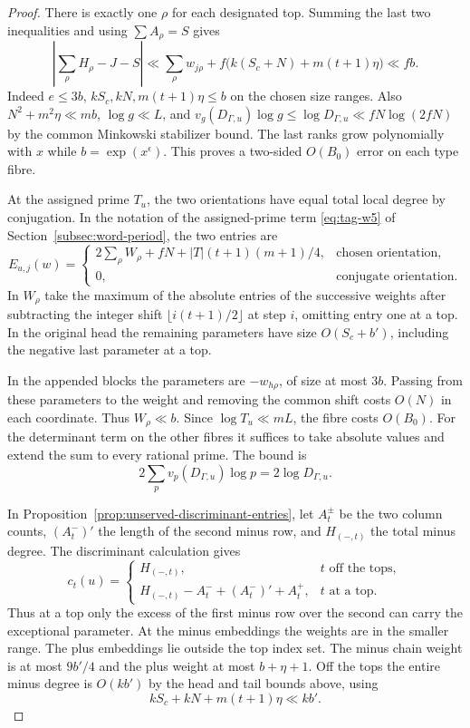 \begin{proof}
There is exactly one
\(\rho\) for each designated top. Summing the last two inequalities
and using \(\sum A_\rho=S\) gives
\[
 \left|\sum_\rho H_\rho-J-S\right|
 \ll \sum_\rho w_{j\rho}+f\big(k(S_c+N)+m(t+1)\eta\big)\ll fb .
\]
Indeed \(e\le 3b\), \(kS_c,kN,m(t+1)\eta\le b\) on the chosen
size ranges. Also \(N^2+m^2\eta\ll mb\), \(\log g\ll L\), and
\(v_g(D_{\Gamma,u})\log g\le\log D_{\Gamma,u}\ll
fN\log(2fN)\) by the common Minkowski stabilizer bound. The last
ranks grow polynomially with \(x\) while \(b=\exp(x^\epsilon)\).
This proves a two-sided \(O(B_0)\) error on each type fibre.

At the assigned prime \(T_u\), the two orientations have equal
total local degree by conjugation. In the notation of the assigned-prime
term \eqref{eq:tag-w5} of Section~\ref{subsec:word-period}, the two entries are
\[
 E_{u,j}(w)=
 \begin{cases}
 2\sum_\rho W_\rho+fN+|T|(t+1)(m+1)/4,&\text{chosen orientation},\\
 0,&\text{conjugate orientation}.
 \end{cases}
\] In \(W_\rho\) take the maximum of the
absolute entries of the successive weights after subtracting the
integer shift \(\lfloor i(t+1)/2\rfloor\) at step \(i\), omitting entry one at a top.
In the original head the remaining parameters have size
\(O(S_c+b')\), including the negative last parameter at a top.

In the appended blocks the parameters are \(-w_{h\rho}\), of
size at most \(3b\). Passing from these parameters to the
weight and removing the common shift costs \(O(N)\) in each
coordinate. Thus \(W_\rho\ll b\). Since \(\log T_u\ll mL\),
the fibre costs \(O(B_0)\). For the determinant term on the other fibres it suffices to take
absolute values and extend the sum to every rational prime. The bound is
\[
            2\sum_p v_p(D_{\Gamma,u})\log p=2\log D_{\Gamma,u}.
\]


In Proposition~\ref{prop:unserved-discriminant-entries}, let
\(A_t^\pm\) be the two column counts, \((A_t^-)'\) the length of
the second minus row, and \(H_{(-,t)}\) the total minus degree.
The discriminant calculation gives
\[
 c_t(u)=
 \begin{cases}
 H_{(-,t)},& t\text{ off the tops},\\
 H_{(-,t)}-A_t^-+(A_t^-)' + A_t^+,&t\text{ at a top}.
 \end{cases}
\]
Thus at a top only the excess of the first minus row over the
second can carry the exceptional parameter. At the minus embeddings the weights are in
the smaller range. The plus embeddings lie outside the top index set.
The minus chain weight is at most \(9b'/4\) and the plus
weight at most \(b+\eta+1\). Off the tops the entire minus degree
is \(O(kb')\) by the head and tail bounds above, using
\[
 kS_c+kN+m(t+1)\eta\ll kb'.
\]


\end{proof}
